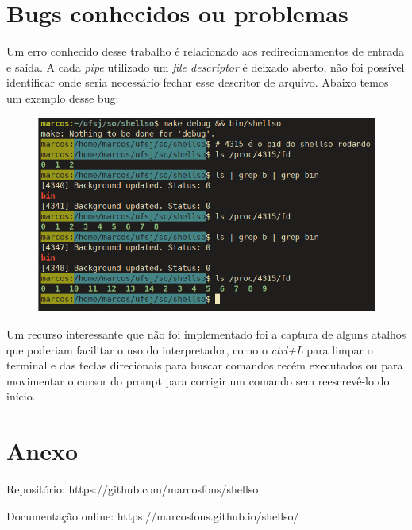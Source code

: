 \documentclass[a4paper, 12pt]{article}
\begin{document}
\section{Bugs conhecidos ou problemas}

Um erro conhecido desse trabalho é relacionado aos redirecionamentos
de entrada e saída. A cada \textit{pipe} utilizado um \textit{file descriptor} é deixado aberto,
não foi possível identificar onde seria necessário fechar esse descritor de arquivo. Abaixo temos um exemplo desse bug:

\begin{figure}[!ht]
	\centering
	\includegraphics[width=12cm]{docs/images/fd.jpeg}
\end{figure}

Um recurso interessante que não foi implementado foi a captura de alguns atalhos
que poderiam facilitar o uso do interpretador, como o \textit{ctrl+L} para limpar
o terminal e das teclas direcionais para buscar comandos recém executados ou para
movimentar o cursor do prompt para corrigir um comando sem reescrevê-lo do início.




\section*{Anexo}
Repositório: https://github.com/marcosfons/shellso

Documentação online: https://marcosfons.github.io/shellso/
\end{document}
